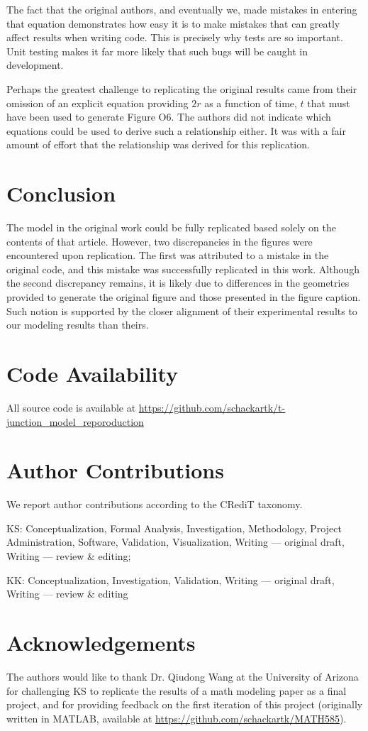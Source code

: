 The fact that the original authors, and eventually we, made mistakes in entering that equation
demonstrates how easy it is to make mistakes that can greatly affect results when writing code.
This is precisely why tests are so important. Unit testing makes it far more likely that
such bugs will be caught in development.

Perhaps the greatest challenge to replicating the original results came from their
omission of an explicit equation providing $2r$ as a function of time, $t$ that must have been
used to generate Figure O6. The authors did not indicate which equations could be used to
derive such a relationship either. It was with a fair amount of effort that the relationship
was derived for this replication.

\section{Conclusion}

The model in the original work could be fully replicated based solely on the contents of
that article. However, two discrepancies in the figures were encountered upon replication.
The first was attributed to a mistake in the original code, and this mistake was successfully
replicated in this work. Although the second discrepancy remains, it is likely due to differences
in the geometries provided to generate the original figure and those presented in the figure caption.
Such notion is supported by the closer alignment of their experimental results to our modeling results
than theirs.

\section{Code Availability}

All source code is available at \url{https://github.com/schackartk/t-junction_model_reporoduction}

\section{Author Contributions}

We report author contributions according to the CRediT taxonomy\supercite{allen_how_2019}.

KS: Conceptualization, Formal Analysis, Investigation, Methodology,
Project Administration, Software, Validation, Visualization, Writing — original draft,
Writing — review \& editing;

KK: Conceptualization, Investigation, Validation, Writing — original draft,
Writing — review \& editing

\section{Acknowledgements}

The authors would like to thank Dr. Qiudong Wang at the University of Arizona for
challenging KS to replicate the results of a math modeling paper as a final project, and
for providing feedback on the first iteration of this project (originally written
in MATLAB, available at \url{https://github.com/schackartk/MATH585}).


